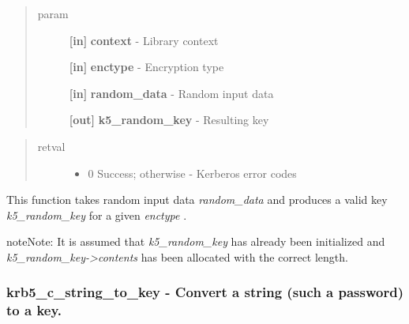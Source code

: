 \documentclass[letterpaper,10pt,english]{sphinxmanual}
\begin{document}
\begin{quote}\begin{description}
\item[{param}] \leavevmode
\textbf{{[}in{]}} \textbf{context} - Library context

\textbf{{[}in{]}} \textbf{enctype} - Encryption type

\textbf{{[}in{]}} \textbf{random\_data} - Random input data

\textbf{{[}out{]}} \textbf{k5\_random\_key} - Resulting key

\end{description}\end{quote}
\begin{quote}\begin{description}
\item[{retval}] \leavevmode\begin{itemize}
\item {} 
0   Success; otherwise - Kerberos error codes

\end{itemize}

\end{description}\end{quote}

This function takes random input data \emph{random\_data} and produces a valid key \emph{k5\_random\_key} for a given \emph{enctype} .




{\hyperref[appdev/refs/api/krb5_c_keylengths:c.krb5_c_keylengths]{}}



\begin{notice}{note}{Note:}
It is assumed that \emph{k5\_random\_key} has already been initialized and \emph{k5\_random\_key-\textgreater{}contents} has been allocated with the correct length.
\end{notice}


\subsubsection{krb5\_c\_string\_to\_key -  Convert a string (such a password) to a key.}
\label{appdev/refs/api/krb5_c_string_to_key:krb5-c-string-to-key-convert-a-string-such-a-password-to-a-key}\label{appdev/refs/api/krb5_c_string_to_key::doc}

\begin{fulllineitems}
\label{appdev/refs/api/krb5_c_string_to_key:c.krb5_c_string_to_key}
\end{fulllineitems}
\end{document}
